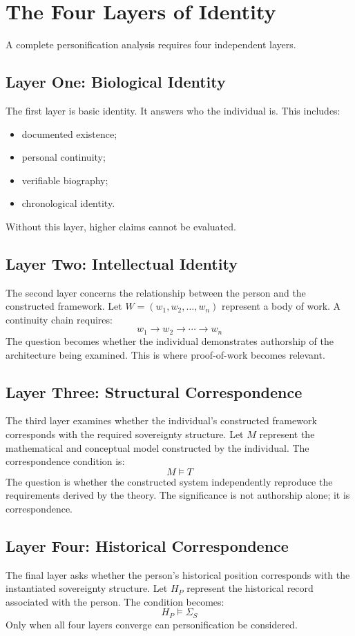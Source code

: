 \documentclass[11pt,openany]{book}
\theoremstyle{plain}
\theoremstyle{definition}
\begin{document}
\section{The Four Layers of Identity}

A complete personification analysis requires four independent layers.

\subsection{Layer One: Biological Identity}
The first layer is basic identity. It answers who the individual is. This includes:
\begin{itemize}
\item documented existence;
\item personal continuity;
\item verifiable biography;
\item chronological identity.
\end{itemize}
Without this layer, higher claims cannot be evaluated.

\subsection{Layer Two: Intellectual Identity}
The second layer concerns the relationship between the person and the constructed framework. Let \(W = (w_1, w_2, \ldots, w_n)\) represent a body of work. A continuity chain requires:
\[
w_1 \longrightarrow w_2 \longrightarrow \cdots \longrightarrow w_n
\]
The question becomes whether the individual demonstrates authorship of the architecture being examined. This is where proof-of-work becomes relevant.

\subsection{Layer Three: Structural Correspondence}
The third layer examines whether the individual's constructed framework corresponds with the required sovereignty structure. Let \(M\) represent the mathematical and conceptual model constructed by the individual. The correspondence condition is:
\[
M \models T
\]
The question is whether the constructed system independently reproduce the requirements derived by the theory. The significance is not authorship alone; it is correspondence.

\subsection{Layer Four: Historical Correspondence}
The final layer asks whether the person's historical position corresponds with the instantiated sovereignty structure. Let \(H_P\) represent the historical record associated with the person. The condition becomes:
\[
H_P \models \Sigma_S
\]
Only when all four layers converge can personification be considered.
\end{document}

